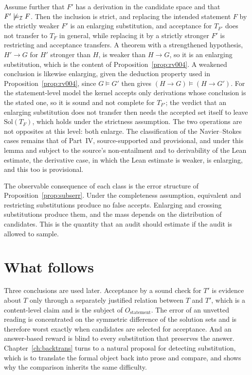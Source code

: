 Assume further that $F'$ has a derivation in the candidate space and that $F'\not\models_{\mathcal{I}} F$. Then the inclusion is strict, and replacing the intended statement $F$ by the strictly weaker $F'$ is an enlarging substitution, and acceptance for $T_{F'}$ does not transfer to $T_F$ in general, while replacing it by a strictly stronger $F'$ is restricting and acceptance transfers. A theorem with a strengthened hypothesis, $H'\to G$ for $H'$ stronger than $H$, is weaker than $H\to G$, so it is an enlarging substitution, which is the content of Proposition~\ref{prop:rv004}. A weakened conclusion is likewise enlarging, given the deduction property used in Proposition~\ref{prop:rv004}, since $G\models G'$ then gives $(H\to G)\models(H\to G')$. For the statement-level model the kernel accepts only derivations whose conclusion is the stated one, so it is sound and not complete for $T_{F'}$; the verdict that an enlarging substitution does not transfer then needs the accepted set itself to leave $\mathrm{Sol}(T_F)$, which holds under the strictness assumption. The two operations are not opposites at this level: both enlarge. The classification of the Navier--Stokes cases remains that of Part~IV, source-supported and provisional, and under this lemma and subject to the source's non-entailment and to derivability of the Lean estimate, the derivative case, in which the Lean estimate is weaker, is enlarging, and this too is provisional.

The observable consequence of each class is the error structure of Proposition~\ref{prop:subserr}. Under the completeness assumption, equivalent and restricting substitutions produce no false accepts. Enlarging and crossing substitutions produce them, and the mass depends on the distribution of candidates. This is the quantity that an audit should estimate if the audit is allowed to sample.

\section{What follows}

Three conclusions are used later. Acceptance by a sound check for $T'$ is evidence about $T$ only through a separately justified relation between $T$ and $T'$, which is a content-level claim and is the subject of $O_{\mathrm{statement}}$. The error of an unvetted reading is concentrated on the symmetric difference of the solution sets and is therefore worst exactly when candidates are selected for acceptance. And an answer-based reward is blind to every substitution that preserves the answer. Chapter~\ref{ch:backtrans} turns to a natural proposal for detecting substitution, which is to translate the formal object back into prose and compare, and shows why the comparison inherits the same difficulty.
